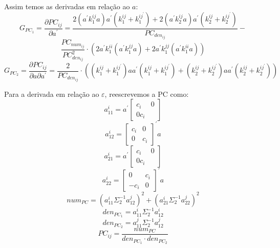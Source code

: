 \documentclass[a4paper,10pt]{article}
\begin{document}
Assim temos as derivadas em relação ao $a$:
\begin{equation}
G_{PC_1} = \frac{\partial PC_{ij}}{\partial a^{'}} = \frac{2 (a^{'} k_{1}^{ij} a) a^{'} (k_{1}^{ij} + k_{1}^{ij^{'}}) + 2 (a^{'} k_{2}^{ij} a) a^{'} (k_{2}^{ij} + k_{2}^{ij^{'}}) } 
{PC_{den_{ij}}} -
\end{equation}
\begin{equation}
\frac{PC_{num_{ij}}}{PC_{den_{ij}}^{2}} \cdot (2 a^{'} k_{1}^{ii} (a^{'} k_{1}^{jj} a) + 2 a^{'} k_{1}^{jj} ( a^{'} k_{1}^{ii} a))
\end{equation}
\begin{equation}
G_{PC_2} = \frac{\partial PC_{ij}}{\partial a \partial a^{'}} = \frac{2}{PC_{den_{ij}}} \cdot ((k_{1}^{ij} + k_{1}^{ij^{'}}) a a^{'} (k_{1}^{ij} + k_{1}^{ij^{'}}) + (k_{2}^{ij} + k_{2}^{ij^{'}}) a a^{'} (k_{2}^{ij} + k_{2}^{ij^{'}}))
\end{equation}

Para a derivada em relação ao $\varepsilon$, reescrevemos a PC como:
\begin{equation}
a_{11}^{i} = a^{'} \left[ \begin{array}{cc}
 c_{i} & 0 \\ 0 c_{i}
\end{array} \right]
\end{equation}
\begin{equation}
a_{12}^{i} = \left[ \begin{array}{cc}
 c_{i} & 0 \\ 0 & c_{i}
\end{array} \right]^{'} a
\end{equation}
\begin{equation}
a_{21}^{i} = a^{'} \left[ \begin{array}{cc}
 c_{i} & 0 \\ 0 c_{i}
\end{array} \right]
\end{equation}
\begin{equation}
a_{22}^{i} = \left[ \begin{array}{cc}
 0 & c_{i} \\ -c_{i} & 0
\end{array} \right]^{'} a
\end{equation}
\begin{equation}
num_{PC} = (a_{11}^{i} \Sigma_{2}^{-1} a_{12}^{j})^{2} + (a_{21}^{i} \Sigma_{2}^{-1} a_{22}^{j})^{2}
\end{equation}
\begin{equation}
den_{PC_{1}} = a_{11}^{i} \Sigma_{2}^{-1} a_{12}^{i}
\end{equation}
\begin{equation}
den_{PC_{2}} = a_{11}^{j} \Sigma_{2}^{-1} a_{12}^{j}
\end{equation}
\begin{equation}
PC_{ij} = \frac{num_{PC}}{den_{PC_{1}} \cdot den_{PC_{2}}}
\end{equation}
\end{document}
